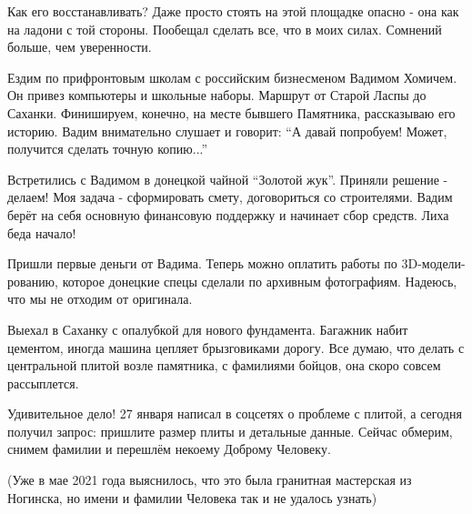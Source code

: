 \begin{multicols}{2}

Как его восстанавливать? Даже просто стоять на этой площадке опасно - она как
на ладони с той стороны. Пообещал сделать все, что в моих силах. Сомнений
больше, чем уверенности.



Ездим по прифронтовым школам с российским бизнесменом Вадимом Хомичем. Он
привез компьютеры и школьные наборы. Маршрут от Старой Ласпы до Саханки.
Финишируем, конечно, на месте бывшего Памятника, рассказываю его историю. Вадим
внимательно слушает и говорит: \enquote{А давай попробуем! Может, получится сделать
точную копию...}



Встретились с Вадимом в донецкой чайной \enquote{Золотой жук}. Приняли решение -
делаем! Моя задача - сформировать смету, договориться со строителями. Вадим
берёт на себя основную финансовую поддержку и начинает сбор средств. Лиха беда
начало!




Пришли первые деньги от Вадима. Теперь можно оплатить работы по
3D-модели-рованию, которое донецкие спецы сделали по архивным фотографиям.
Надеюсь, что мы не отходим от оригинала.



Выехал в Саханку с опалубкой для нового фундамента. Багажник набит цементом,
иногда машина цепляет брызговиками дорогу. Все думаю, что делать с центральной
плитой возле памятника, с фамилиями бойцов, она скоро совсем рассыплется.


Удивительное дело! 27 января написал в соцсетях о проблеме с плитой, а сегодня
получил запрос: пришлите размер плиты и детальные данные. Сейчас обмерим,
снимем фамилии и перешлём некоему Доброму Человеку.

(Уже в мае 2021 года выяснилось, что это была гранитная мастерская из Ногинска,
но имени и фамилии Человека так и не удалось узнать)


\end{multicols}
